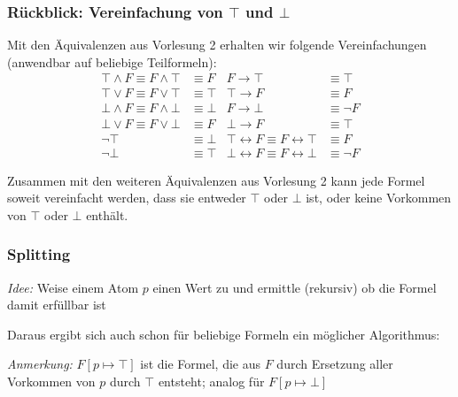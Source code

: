 \documentclass[aspectratio=1610,onlymath]{beamer}
\let\beameroriginaldoublebackslash\\
\let\\=\beameroriginaldoublebackslash
\begin{document}
\begin{frame}\frametitle{Rückblick: Vereinfachung von $\top$ und $\bot$}

Mit den Äquivalenzen aus Vorlesung 2 erhalten wir folgende Vereinfachungen (anwendbar auf beliebige Teilformeln):
% 
\begin{align*}
%
\top\wedge F  \equiv F\wedge \top & \equiv F		& F\to \top & \equiv \top\\
\top \vee F\equiv F\vee \top & \equiv \top    & \top\to F & \equiv F\\[1ex]
%
\bot\wedge F\equiv F\wedge \bot & \equiv \bot	& F\to \bot & \equiv \neg F\\
\bot\vee F\equiv F\vee \bot & \equiv F		& \bot\to F & \equiv \top\\[1ex]
%
\neg\top & \equiv \bot	& \top\leftrightarrow F\equiv F\leftrightarrow\top & \equiv F\\
\neg\bot & \equiv \top	& \bot\leftrightarrow F\equiv F\leftrightarrow\bot & \equiv \neg F
\end{align*}

Zusammen mit den weiteren Äquivalenzen aus Vorlesung 2 kann jede Formel soweit vereinfacht werden, dass sie entweder $\top$ oder $\bot$ ist,
oder keine Vorkommen von $\top$ oder $\bot$ enthält.

\end{frame}

\begin{frame}\frametitle{Splitting}

\emph{Idee:} Weise einem Atom $p$ einen Wert zu und ermittle (rekursiv) ob die Formel damit erfüllbar ist
\bigskip\pause

Daraus ergibt sich auch schon für beliebige Formeln ein möglicher Algorithmus:

\emph{Anmerkung:} $F[p\mapsto\top]$ ist die Formel, die aus $F$ durch Ersetzung aller Vorkommen von $p$ durch $\top$ entsteht; analog für $F[p\mapsto\bot]$\\

\end{frame}
\end{document}
